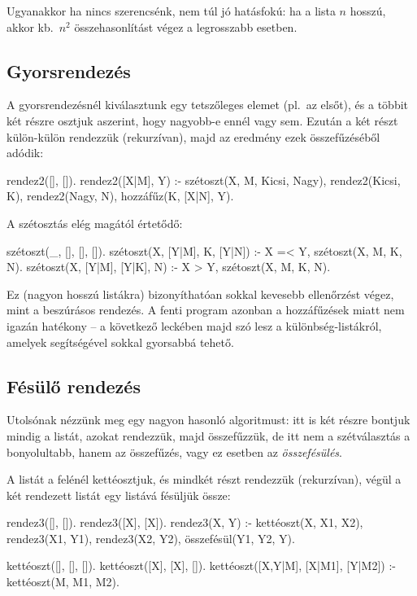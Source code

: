 Ugyanakkor ha nincs szerencsénk, nem túl jó
hatásfokú: ha a lista $n$ hosszú, akkor kb.~$n^2$
összehasonlítást végez a legrosszabb esetben.

\subsection*{Gyorsrendezés}
A gyorsrendezésnél kiválasztunk egy tetszőleges
elemet (pl.~az elsőt), és a többit két részre
osztjuk aszerint, hogy nagyobb-e ennél vagy
sem. Ezután a két részt külön-külön rendezzük
(rekurzívan), majd az eredmény ezek összefűzéséből
adódik:
\begin{program}
rendez2([], []).
rendez2([X|M], Y) :-
    szétoszt(X, M, Kicsi, Nagy),
    rendez2(Kicsi, K),
    rendez2(Nagy, N),
    hozzáfűz(K, [X|N], Y).
\end{program}
A szétosztás elég magától értetődő:
\begin{program}
szétoszt(_, [], [], []).
szétoszt(X, [Y|M], K, [Y|N]) :-
    X =< Y, szétoszt(X, M, K, N).
szétoszt(X, [Y|M], [Y|K], N) :-
    X > Y, szétoszt(X, M, K, N).
\end{program}

Ez (nagyon hosszú listákra) bizonyíthatóan sokkal
kevesebb ellenőrzést végez, mint a beszúrásos
rendezés. A fenti program azonban a hozzáfűzések
miatt nem igazán hatékony -- a következő leckében
majd szó lesz a különbség-listákról, amelyek
segítségével sokkal gyorsabbá tehető.

\subsection*{Fésülő rendezés}
Utolsónak nézzünk meg egy nagyon hasonló
algoritmust: itt is két részre bontjuk mindig a
listát, azokat rendezzük, majd összefűzzük, de itt
nem a szétválasztás a bonyolultabb, hanem az
összefűzés, vagy ez esetben az \emph{összefésülés}.

A listát a felénél kettéosztjuk, és mindkét részt
rendezzük (rekurzívan), végül a két rendezett listát
egy listává fésüljük össze:
\begin{program}
rendez3([], []).
rendez3([X], [X]).
rendez3(X, Y) :-
    kettéoszt(X, X1, X2),
    rendez3(X1, Y1),
    rendez3(X2, Y2),
    összefésül(Y1, Y2, Y).

kettéoszt([], [], []).
kettéoszt([X], [X], []).
kettéoszt([X,Y|M], [X|M1], [Y|M2]) :-
    kettéoszt(M, M1, M2).
\end{program}

